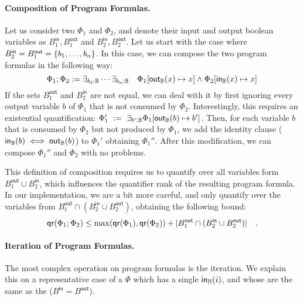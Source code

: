 \paragraph{Composition of Program Formulas.}
Let us consider two  $\Phi_1$ and $\Phi_2$,
and denote their input and output boolean variables as 
$B_1^{\mathsf{in}}, B_1^{\mathsf{out}}$ and $B_2^{\mathsf{in}}, B_2^{\mathsf{out}}$.
Let us start with the case where $B_2^{\mathsf{in}} = B_1^{\mathsf{out}} = \{ b_1, \dots, b_n \}$.
In this case, we can compose the two program formulas in the following way:
\begin{equation*}
    \Phi_1 ; \Phi_2 :=
    \exists_{b_1 : \mathbb{B}} \cdots \exists_{b_n : \mathbb{B}}
    \quad
    \Phi_1[ \mathsf{out}_{\mathbb{B}}(x) \mapsto x ]
    \wedge 
    \Phi_2[ \mathsf{in}_{\mathbb{B}}(x) \mapsto x ]
\end{equation*}
If the sets $B_1^{\mathsf{out}}$ and $B_2^{\mathsf{in}}$ are not equal,
we can deal with it by first ignoring every output variable $b$
of $\Phi_1$ that is not consumed by $\Phi_2$. Interestingly, this
requires an existential quantification:
$\Phi_1' \ := \ \exists_{b' : \mathbb{B}} \Phi_1[\mathsf{out}_{\mathbb{B}}(b) \mapsto b']$.
Then, for each variable $b$ that is consumed by $\Phi_2$ but not produced by $\Phi_1$,
we add the identity clause ($\mathsf{in}_{\mathbb{B}}(b) \iff \mathsf{out}_{\mathbb{B}}(b)$) to $\Phi_1'$ obtaining $\Phi_1''$.
After this modification, we can compose $\Phi_1''$ and $\Phi_2$ with no problems.

This definition of composition requires us to quantify over all variables form
$B_1^{\mathsf{out}} \cup B_2^{\mathsf{in}}$, which influences
the quantifier rank of the resulting program formula.
In our implementation, we are a bit more careful,
and only quantify over the variables from $B_1^{\mathsf{out}}
\cap (B_2^{\mathsf{in}} \cup B_2^{\mathsf{out}})$, obtaining the following bound:
\begin{equation*}
    \mathop{\mathsf{qr}}(\Phi_1 ; \Phi_2) 
    \leq \max(\mathop{\mathsf{qr}}(\Phi_1), \mathop{\mathsf{qr}}(\Phi_2)) 
    +    |B_1^{\mathsf{out}} \cap (B_2^{\mathsf{in}} \cup B_2^{\mathsf{out}})|
    \quad .
\end{equation*}

\paragraph{Iteration of Program Formulas.} The most complex operation on 
program formulas is the iteration. We explain this on a representative 
case of a  $\Phi$ which has a single  $\mathsf{in}_{\mathbb{N}}(i)$,
and whose  are the same as the 
($B^{\mathsf{in}} = B^{\mathsf{out}}$).

